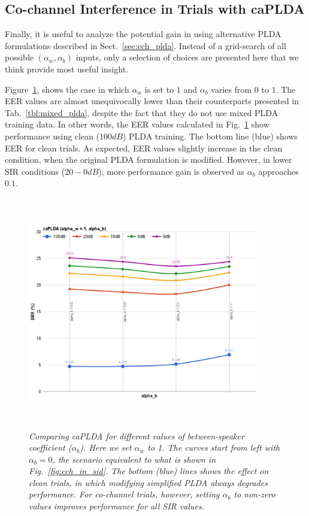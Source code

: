 \subsection{Co-channel Interference in Trials with caPLDA}
\label{ssec:caplda_exp}
Finally, it is useful to analyze the potential gain in using alternative PLDA formulations described in Sect.~\ref{sec:cch_plda}. 
Instead of a grid-search of all possible $(\alpha_w,\alpha_b)$ inputs, only a selection of choices are presented here that we think provide most useful insight. 

Figure~\ref{fig:alpha_w_is_1}, shows the case in which $\alpha_w$ is set to $1$ and $\alpha_b$ varies from $0$ to $1$. 
The EER values are almost unequivocally lower than their counterparts presented in Tab.~\ref{tbl:mixed_plda}, despite the fact that they do not use mixed PLDA training data. 
In other words, the EER values calculated in Fig.~\ref{fig:alpha_w_is_1} show performance using clean ($100dB$) PLDA training. 
The bottom line (blue) shows EER for clean trials. 
As expected, EER values slightly increase in the clean condition, when the original PLDA formulation is modified. 
However, in lower SIR conditions ($20-0dB$), more performance gain is observed as $\alpha_b$ approaches $0.1$. 

\begin{figure}[h!]
	\centering
	\includegraphics[height = 4in, width=0.9\textwidth]{figures/eer_vs_alphab}
	\vspace{-2mm}
	\caption{\it \small Comparing caPLDA for different values of between-speaker coefficient ($\alpha_b$). Here we set $\alpha_w$ to 1. The curves start from left with $\alpha_b = 0$, the scenario equivalent to what is shown in Fig.~\ref{fig:cch_in_sid}. The bottom (blue) lines shows the effect on clean trials, in which modifying simplified PLDA always degrades performance. For co-channel trials, however, setting $\alpha_b$ to non-zero values improves performance for all SIR values.}
	\label{fig:alpha_w_is_1}
	\vspace{-1mm}
\end{figure}

